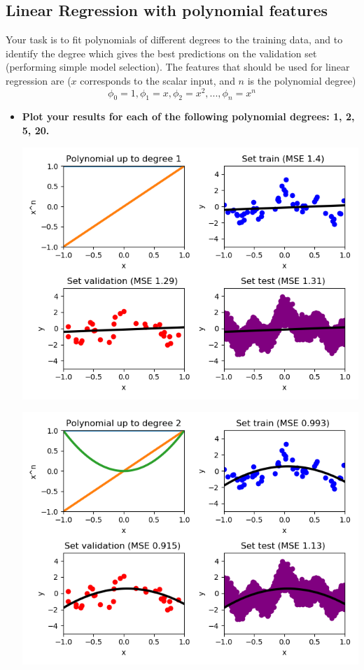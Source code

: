 \documentclass[a4paper]{article}
\begin{document}
\newpage

\subsection{Linear Regression with polynomial features }
Your task is to fit polynomials of different degrees to the training data, and to identify the degree which gives
the best predictions on the validation set (performing simple model selection). The features that should be
used for linear regression are ($x$ corresponds to the scalar input, and $n$ is the polynomial degree)
\[\phi_0 = 1, \phi_1 = x, \phi_2 = x^2, . . . , \phi_n = x^n\]

\begin{itemize} 
\item \textbf{Plot your results for each of the following polynomial degrees: 1, 2, 5, 20.}\\
\begin{minipage}[b]{0.4\textwidth}
  \vspace{10pt}
  \includegraphics[scale=0.35]{plots/plot_poly_degree1.png}
 \captionsetup{justification=centering}
  \label{plot_poly_degree1}
\end{minipage}
\hfill
\begin{minipage}[b]{0.4\textwidth}
  \includegraphics[scale=0.35]{plots/plot_poly_degree2.png}

\end{minipage}
\end{itemize}
\end{document}
